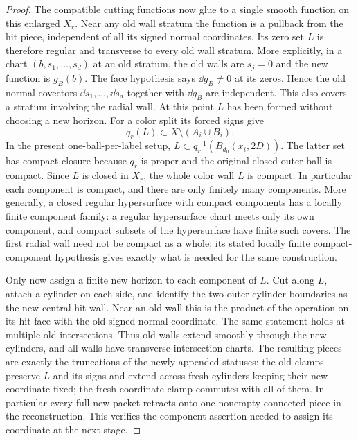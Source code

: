 \begin{proof}
The compatible cutting functions now glue to a single smooth function
on this enlarged $X_r$.  Near any old wall stratum the function is a
pullback from the hit piece, independent of all its signed normal
coordinates.  Its zero set $L$ is therefore regular and transverse
to every old wall stratum.  More explicitly, in a chart
$(b,s_1,\ldots,s_d)$ at an old stratum, the old walls are $s_j=0$
and the new function is $g_B(b)$.  The face hypothesis says
$\dd g_B\ne0$ at its zeros.  Hence the old normal covectors
$\dd s_1,\ldots,\dd s_d$ together with $\dd g_B$ are independent.
This also covers a stratum involving the radial wall.  At this point
$L$ has been formed without choosing a new horizon.  For a color split its forced signs give
\[
 q_r(L)\subset X\setminus(A_i\cup B_i).
\]
In the present one-ball-per-label setup,
$L\subset q_r^{-1}(B_{d_0}(x_i,2D))$.  The latter set has compact
closure because $q_r$ is proper and the original closed outer ball
is compact.  Since $L$ is closed in $X_r$, the whole color wall $L$
is compact.  In particular each component is compact, and there are
only finitely many components.  More generally, a closed regular
hypersurface with compact components has a locally finite component
family: a regular hypersurface chart meets only its own component,
and compact subsets of the hypersurface have finite such covers.
The first radial wall need not be compact as a whole; its stated
locally finite compact-component hypothesis gives exactly what is
needed for the same construction.

Only now assign a finite new horizon to each component of $L$.
Cut along $L$, attach a cylinder on each side, and identify the two
outer cylinder boundaries as the new central hit wall.  Near an old
wall this is the product of the operation on its hit face with the
old signed normal coordinate.  The same statement holds at multiple
old intersections.  Thus old walls extend smoothly through the new
cylinders, and all walls have transverse intersection charts.
The resulting pieces are exactly the truncations of the newly
appended statuses: the old clamps preserve $L$ and its signs and
extend across fresh cylinders keeping their new coordinate fixed;
the fresh-coordinate clamp commutes with all of them.  In particular
every full new packet retracts onto one nonempty connected piece
in the reconstruction.  This verifies the component assertion
needed to assign its coordinate at the next stage.


\end{proof}
